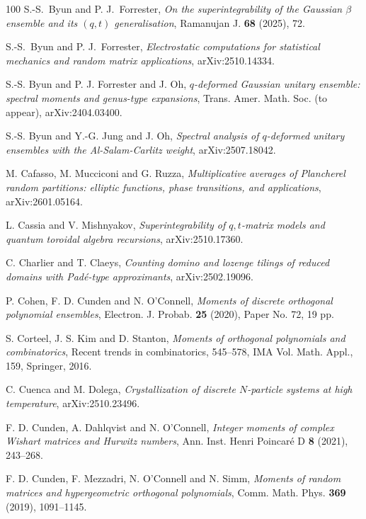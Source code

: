 \documentclass{amsart}
\theoremstyle{plain}
\theoremstyle{remark}
\numberwithin{equation}{section}
\begin{document}
\begin{thebibliography}{100}
 S.-S.~Byun and P. J.~Forrester, \emph{On the superintegrability of the Gaussian $\beta$ ensemble and its $(q,t)$ generalisation}, Ramanujan J. \textbf{68} (2025), 72.

 S.-S.~Byun and P. J.~Forrester, \emph{Electrostatic computations for statistical mechanics and random matrix applications}, arXiv:2510.14334.

 S.-S. Byun and P. J. Forrester and J. Oh, \emph{$q$-deformed Gaussian unitary ensemble: spectral moments and genus-type expansions}, Trans. Amer. Math. Soc. (to appear), arXiv:2404.03400.

 S.-S. Byun and Y.-G. Jung and J. Oh, \emph{Spectral analysis of $q$-deformed unitary ensembles with the Al-Salam-Carlitz weight}, arXiv:2507.18042.

 M. Cafasso, M. Mucciconi and G. Ruzza, \emph{Multiplicative averages of Plancherel random partitions: elliptic functions, phase transitions, and applications}, arXiv:2601.05164. 

 L. Cassia and V. Mishnyakov, \emph{Superintegrability of $q,t$-matrix models and quantum toroidal algebra recursions}, arXiv:2510.17360. 

 C. Charlier and T. Claeys, \emph{Counting domino and lozenge tilings of reduced domains with Pad\'{e}-type approximants}, arXiv:2502.19096. 

 P. Cohen, F. D. Cunden and N. O'Connell, \emph{Moments of discrete orthogonal polynomial ensembles}, Electron. J. Probab. \textbf{25} (2020), Paper No. 72, 19 pp.

 S. Corteel, J. S. Kim and D. Stanton, \emph{Moments of orthogonal polynomials and combinatorics}, Recent trends in combinatorics, 545–578, IMA Vol. Math. Appl., 159, Springer, 2016.

 C. Cuenca and M. Dolega, \emph{Crystallization of discrete $N$-particle systems at high temperature}, arXiv:2510.23496. 

 F. D. Cunden, A. Dahlqvist and N. O’Connell, \emph{Integer moments of complex Wishart matrices and Hurwitz numbers}, Ann. Inst. Henri Poincaré D \textbf{8} (2021), 243--268.

 F. D. Cunden, F. Mezzadri, N. O'Connell and N. Simm, \emph{Moments of random matrices and hypergeometric orthogonal polynomials}, Comm. Math. Phys. \textbf{369} (2019), 1091--1145.


\end{thebibliography}
\end{document}
